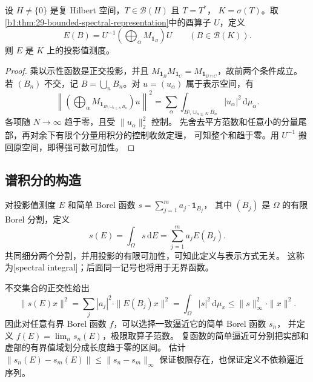 \begin{proposition}[从乘法表示构造投影]
\label{b1:prop:29-pvm-construction}
设 \(H\ne\{0\}\) 是复 Hilbert 空间，\(T\in\mathcal B(H)\) 且 \(T=T^*\)，
\(K=\sigma(T)\)。取\cref{b1:thm:29-bounded-spectral-representation}中的酉算子 \(U\)，定义
\[
 E(B)=U^{-1}\left(\bigoplus_\alpha M_{\mathbf1_B}\right)U
 \qquad(B\in\mathcal B(K)).
\]
则 \(E\) 是 \(K\) 上的投影值测度。
\end{proposition}
\begin{proof}
乘以示性函数是正交投影，并且
\(M_{\mathbf1_B}M_{\mathbf1_C}=M_{\mathbf1_{B\cap C}}\)，故前两个条件成立。
若 \((B_n)\) 不交，记 \(B=\bigcup_n B_n\)。对 \(u=(u_\alpha)\) 属于表示空间，有
\[
 \left\|\left(\bigoplus_\alpha M_{\mathbf1_{B\setminus\cup_{n\leq N}B_n}}\right)u\right\|^2
 =\sum_\alpha\int_{B\setminus\cup_{n\leq N}B_n}|u_\alpha|^2\,\mathrm{d}\mu_\alpha.
\]
各项随 \(N\to\infty\) 趋于零，且受 \(\|u_\alpha\|_2^2\) 控制。
先舍去平方范数和任意小的分量尾部，再对余下有限个分量用积分的控制收敛定理，
可知整个和趋于零。用 \(U^{-1}\) 搬回原空间，即得强可数可加性。
\end{proof}

\subsection{谱积分的构造}
\label{b1:subsec:290402}

对投影值测度 \(E\) 和简单 Borel 函数 \(s=\sum_{j=1}^m a_j\cdot\mathbf1_{B_j}\)，
其中 \((B_j)\) 是 \(\Omega\) 的有限 Borel 分割，定义
\[
 s(E)=\int_\Omega s\,\mathrm{d}E=\sum_{j=1}^m a_jE(B_j).
\]
共同细分两个分割，并用投影的有限可加性，可知此定义与表示方式无关。
这称为[spectral integral]；后面同一记号也将用于无界函数。

\ProseParagraphBreak

不交集合的正交性给出
\[
 \|s(E)x\|^2=\sum_j|a_j|^2\cdot\|E(B_j)x\|^2
 =\int_\Omega|s|^2\,\mathrm{d}\mu_x
 \leq\|s\|_\infty^2\cdot\|x\|^2.
\]
因此对任意有界 Borel 函数 \(f\)，可以选择一致逼近它的简单 Borel 函数 \(s_n\)，
并定义 \(f(E)=\lim_n s_n(E)\)，极限取算子范数。
复函数的简单逼近可分别把实部和虚部的有界值域划分成长度趋于零的区间。
估计 \(\|s_n(E)-s_m(E)\|\leq\|s_n-s_m\|_\infty\)
保证极限存在，也保证定义不依赖逼近序列。

